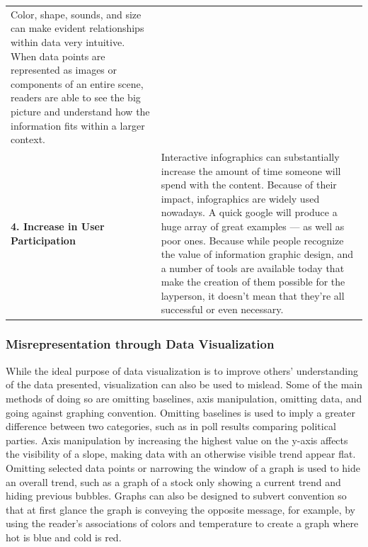 \documentclass[]{book}
\theoremstyle{definition}
\theoremstyle{definition}
\theoremstyle{definition}
\theoremstyle{remark}
\begin{document}
\begin{longtable}[]{@{}ll@{}}
\begin{minipage}[t]{0.78\columnwidth}
Color, shape, sounds, and size can make evident relationships within
data very intuitive. When data points are represented as images or
components of an entire scene, readers are able to see the big picture
and understand how the information fits within a larger context.\strut
\end{minipage}\tabularnewline
\begin{minipage}[t]{0.16\columnwidth}\raggedright\strut
\textbf{4. Increase in User Participation}\strut
\end{minipage} & \begin{minipage}[t]{0.78\columnwidth}\raggedright\strut
Interactive infographics can substantially increase the amount of time
someone will spend with the content. Because of their impact,
infographics are widely used nowadays. A quick google will produce a
huge array of great examples --- as well as poor ones. Because while
people recognize the value of information graphic design, and a number
of tools are available today that make the creation of them possible for
the layperson, it doesn't mean that they're all successful or even
necessary.\strut
\end{minipage}\tabularnewline
\bottomrule
\end{longtable}

\subsubsection{Misrepresentation through Data
Visualization}\label{misrepresentation-through-data-visualization}

While the ideal purpose of data visualization is to improve others'
understanding of the data presented, visualization can also be used to
mislead. Some of the main methods of doing so are omitting baselines,
axis manipulation, omitting data, and going against graphing convention.
Omitting baselines is used to imply a greater difference between two
categories, such as in poll results comparing political parties. Axis
manipulation by increasing the highest value on the y-axis affects the
visibility of a slope, making data with an otherwise visible trend
appear flat. Omitting selected data points or narrowing the window of a
graph is used to hide an overall trend, such as a graph of a stock only
showing a current trend and hiding previous bubbles. Graphs can also be
designed to subvert convention so that at first glance the graph is
conveying the opposite message, for example, by using the reader's
associations of colors and temperature to create a graph where hot is
blue and cold is red.
\end{document}
